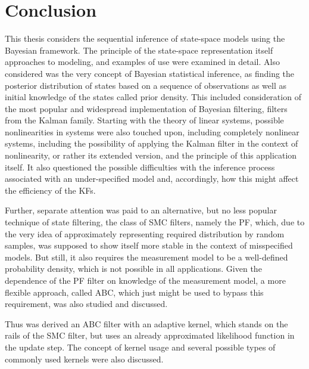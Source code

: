 \chapter{Conclusion}
\label{chap:conclusion}
This thesis considers the sequential inference of state-space models using the Bayesian framework. The principle of the state-space representation itself approaches to modeling, and examples of use were examined in detail. Also considered was the very concept of Bayesian statistical inference, as finding the posterior distribution of states based on a sequence of observations as well as initial knowledge of the states called prior density. This included consideration of the most popular and widespread implementation of Bayesian filtering, filters from the Kalman family. Starting with the theory of linear systems, possible nonlinearities in systems were also touched upon, including completely nonlinear systems, including the possibility of applying the Kalman filter in the context of nonlinearity, or rather its extended version, and the principle of this application itself. It also questioned the possible difficulties with the inference process associated with an under-specified model and, accordingly, how this might affect the efficiency of the KFs.

Further, separate attention was paid to an alternative, but no less popular technique of state filtering, the class of SMC filters, namely the PF, which, due to the very idea of approximately representing required distribution by random samples, was supposed to show itself more stable in the context of misspecified models. But still, it also requires the measurement model to be a well-defined probability density, which is not possible in all applications. Given the dependence of the PF filter on knowledge of the measurement model, a more flexible approach, called ABC, which just might be used to bypass this requirement, was also studied and discussed.

Thus was derived an ABC filter with an adaptive kernel, which stands on the rails of the SMC filter, but uses an already approximated likelihood function in the update step. The concept of kernel usage and several possible types of commonly used kernels were also discussed.


